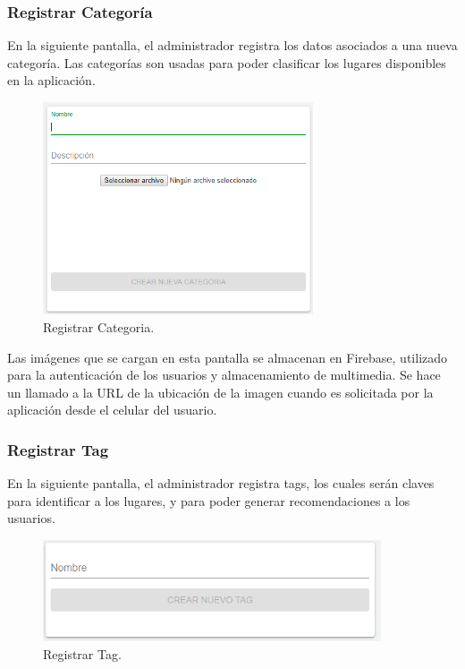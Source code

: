 \documentclass[12pt,letterpaper,openany]{book}
\begin{document}
\subsubsection{Registrar Categoría}
En la siguiente pantalla, el administrador registra los datos asociados a una nueva categoría.
Las categorías son usadas para poder clasificar los lugares disponibles en la aplicación.
\begin{figure}[H]
\begin{center}
\includegraphics[width=8cm]{./imagenes/admin/r_categoria}
\caption{Registrar Categoria.}
\end{center}
\end{figure}

Las imágenes que se cargan en esta pantalla se almacenan en Firebase, utilizado para la autenticación de los usuarios y almacenamiento de multimedia. Se hace un llamado a la URL de la ubicación de la imagen cuando es solicitada por la aplicación desde el celular del usuario.

\subsubsection{Registrar Tag}
En la siguiente pantalla, el administrador registra tags, los cuales serán claves para identificar a los lugares, y para poder generar recomendaciones a los usuarios.
\begin{figure}[H]
\begin{center}
\includegraphics[width=10cm]{./imagenes/admin/r_tags}
\caption{Registrar Tag.}
\end{center}
\end{figure}
\end{document}
